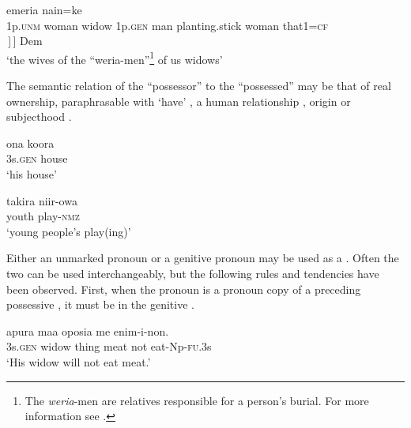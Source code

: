 \ea%
\label{ex:4:x405}
\glll {}       emeria  nain=ke \\
      1p.\textsc{unm}                         woman                                      widow                                      1p.\textsc{gen}                             man                                     planting.stick                              woman  that1=\textsc{cf}   \\
      [Poss~NP                                {}                                         {}                                         [Poss~NP                                    {}                                      {}                                          [HN]\,]\,]   Dem \\
\glt`the wives of the ``weria-men''\footnote{The \textit{weria}-men are relatives responsible for a person's burial. For more information see .} of us widows'
\z

The semantic relation of the ``possessor'' to the ``possessed'' may be that of real ownership, paraphrasable with `have' , a human relationship , origin  or subjecthood . 

\ea%
\label{ex:4:x406}
\gll ona  koora \\
    3s.\textsc{gen}  house  \\
\glt`his house'
\z

\ea%
\label{ex:4:x407}
\gll takira  niir-owa \\
  youth  play-\textsc{nmz}    \\
\glt`young  people's play(ing)'
\z

Either an unmarked pronoun or a genitive pronoun may be used as a  . Often the two can be used interchangeably, but the following rules and tendencies have been observed. First, when the pronoun is a pronoun copy of a preceding possessive , it must be in the genitive . 

\ea%
\label{ex:4:x409}
\gll {}  apura  maa  oposia  me  enim-i-non. \\
  3s.\textsc{gen}  widow  thing  meat  not  eat-Np-\textsc{fu}.3s    \\
\glt`His widow will not eat meat.'
\z

